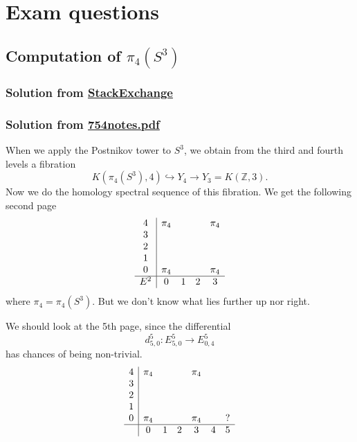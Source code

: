 \section{Exam questions}\label{sec:Exam questions}
\subsection{Computation of $\pi_{4}(S^{3})$}
\subsubsection{Solution from  \href{https://math.stackexchange.com/questions/1102897/computing-pi-4s3-using-serre-spectral-sequence}{StackExchange}}


\subsubsection{Solution from \href{https://people.math.wisc.edu/~lmaxim/754notes.pdf}{754notes.pdf}}
When we apply the Postnikov tower to $S^{3}$, we obtain from the third and fourth levels a fibration
\[K(\pi_{4}(S^{3}),4)\hookrightarrow Y_{4}\to Y_3=K(\mathbb{Z},3).\]
Now we do the homology spectral sequence of this fibration. We get the following second page
	\begin{align*}
		\begin{array}{c|c c c c}
			4&\pi_{4}&&&\pi_{4}\\
			3&&&&\\
			2&&&&\\
			1&&&&\\
			0&\pi_4&&&\pi_4\\
			\hline
			E^{2}&0&1&2&3
		\end{array}
	\end{align*}
	where $\pi_4=\pi_{4}(S^{3})$. But we don't know what lies further up nor right.

	We should look at the 5th page, since the differential
	\[d^{5}_{5,0}:E^{5}_{5,0}\to E^{5}_{0,4}\]
	has chances of being non-trivial.
	\begin{align*}
		\begin{array}{c|c c c c c c}
			4&\pi_{4}&&&\pi_{4}&&\\
			3&&&&&&\\
			2&&&&&&\\
			1&&&&&&\\
			0&\pi_4&&&\pi_4&&?\\
			\hline
			&0&1&2&3&4&5
		\end{array}
	\end{align*}

